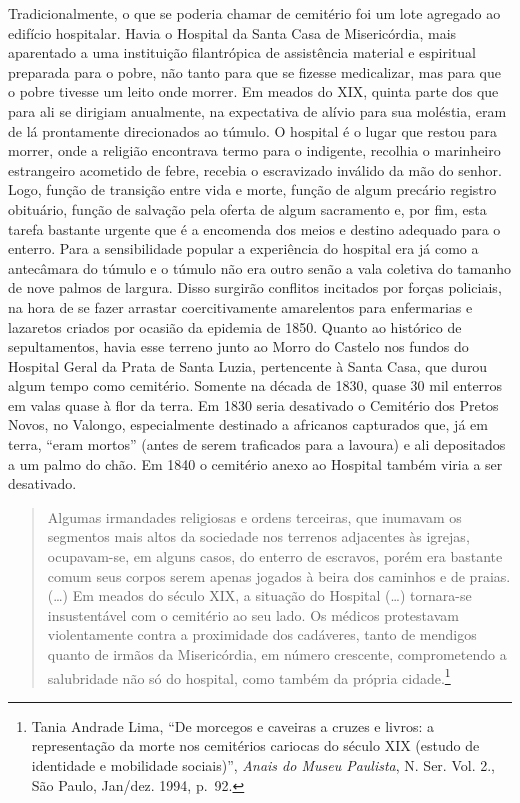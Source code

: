 Tradicionalmente, o que se poderia chamar de cemitério foi um lote
agregado ao edifício hospitalar. Havia o Hospital da Santa Casa de
Misericórdia, mais aparentado a uma instituição filantrópica de
assistência material e espiritual preparada para o pobre, não tanto para
que se fizesse medicalizar, mas para que o pobre tivesse um leito onde
morrer. Em meados do XIX, quinta parte dos que para ali se dirigiam
anualmente, na expectativa de alívio para sua moléstia, eram de lá
prontamente direcionados ao túmulo. O hospital é o lugar que restou para
morrer, onde a religião encontrava termo para o indigente, recolhia o
marinheiro estrangeiro acometido de febre, recebia o escravizado
inválido da mão do senhor. Logo, função de transição entre vida e morte,
função de algum precário registro obituário, função de salvação pela
oferta de algum sacramento e, por fim, esta tarefa bastante urgente que
é a encomenda dos meios e destino adequado para o enterro. Para a
sensibilidade popular a experiência do hospital era já como a antecâmara
do túmulo e o túmulo não era outro senão a vala coletiva do tamanho de
nove palmos de largura. Disso surgirão conflitos incitados por forças
policiais, na hora de se fazer arrastar coercitivamente amarelentos para
enfermarias e lazaretos criados por ocasião da epidemia de 1850. Quanto
ao histórico de sepultamentos, havia esse terreno junto ao Morro do
Castelo nos fundos do Hospital Geral da Prata de Santa Luzia,
pertencente à Santa Casa, que durou algum tempo como cemitério. Somente
na década de 1830, quase 30 mil enterros em valas quase à flor da terra.
Em 1830 seria desativado o Cemitério dos Pretos Novos, no Valongo,
especialmente destinado a africanos capturados que, já em terra, ``eram
mortos'' (antes de serem traficados para a lavoura) e ali depositados a
um palmo do chão. Em 1840 o cemitério anexo ao Hospital também viria a
ser desativado.

\begin{quote}
Algumas irmandades religiosas e ordens terceiras, que inumavam os
segmentos mais altos da sociedade nos terrenos adjacentes às igrejas,
ocupavam-se, em alguns casos, do enterro de escravos, porém era bastante
comum seus corpos serem apenas jogados à beira dos caminhos e de praias.
(\ldots{}) Em meados do século XIX, a situação do Hospital (\ldots{})
tornara-se insustentável com o cemitério ao seu lado. Os médicos
protestavam violentamente contra a proximidade dos cadáveres, tanto de
mendigos quanto de irmãos da Misericórdia, em número crescente,
comprometendo a salubridade não só do hospital, como também da própria
cidade.\footnote{Tania Andrade Lima, ``De morcegos e caveiras a cruzes e
  livros: a representação da morte nos cemitérios cariocas do século XIX
  (estudo de identidade e mobilidade sociais)'', \textit{Anais do Museu
  Paulista}, N. Ser. Vol. 2., São Paulo, Jan/dez. 1994, p.~92.}
\end{quote}

